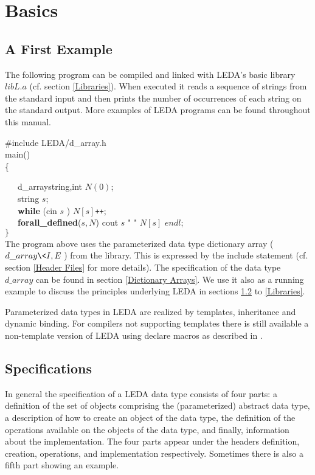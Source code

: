 \chapter{Basics}

\label{Basics}

\section{A First Example}

\label{A First Example}
The following program can be compiled and linked 
with LEDA's basic library $libL.a$ (cf. section \ref{Libraries}).
When executed it reads a sequence of strings from the standard input and then 
prints the number of occurrences of each string on the standard output. More 
examples of LEDA programs can be found throughout this manual.

\#include \<LEDA/d\_array.h\>\\
main()\\
\{

\ \ \ d\_array\<string,int\> $N(0)$;\\
\smallskip
\ \ \ string $s$;\\
\smallskip
\ \ \ {\bf while} (cin \>\> $s$ ) $N[s]${\tt ++};\\
\smallskip
\ \ \ {\bf forall\_defined}($s,N$) 
                cout \<\< $s$ \<\< " " \<\< $N[s]$ \<\< $endl$;\\
\smallskip
$\}$\\


The program above uses the parameterized data type dictionary array 
($d\_array\<I,E\>$) from the library. This is expressed by the include 
statement (cf. section \ref{Header Files} for more details). The specification 
of the 
data type $d\_array$ can be found in section \ref{Dictionary Arrays}.
We use it also as a 
running example to discuss the principles underlying LEDA in sections 
\ref{Specifications}
to \ref{Libraries}.

Parameterized data types in LEDA are realized by templates,
inheritance and dynamic binding. 
For \CC compilers not supporting templates there is still available a 
non-template version of LEDA using declare macros as described in \cite{N90}.


\section{Specifications}

\label{Specifications}
In general the specification of a LEDA data type consists of four parts:
a definition of the set of objects comprising the (parameterized) abstract
data type, a description of how to create an object of the data type,
the definition of the operations available on the objects of the data 
type, and finally, information about the implementation. The four parts 
appear under the headers definition, creation, operations, and implementation 
respectively.
Sometimes there is also a fifth part showing an example.

